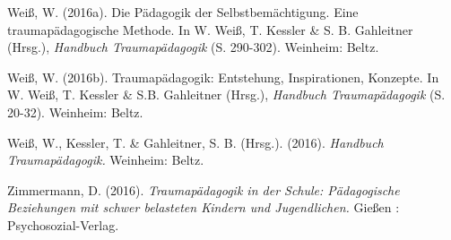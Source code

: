 \hang
Weiß, W. (2016a). Die Pädagogik der Selbstbemächtigung. Eine traumapädagogische Methode. In W. Weiß, T. Kessler \& S. B. Gahleitner (Hrsg.), \textit{Handbuch Traumapädagogik} (S. 290-302). Weinheim: Beltz.

\hang
Weiß, W. (2016b). Traumap{\"a}dagogik: Entstehung, Inspirationen, Konzepte. In W. Weiß, T. Kessler \& S.B. Gahleitner (Hrsg.), \textit{Handbuch Traumapädagogik} (S. 20-32). Weinheim: Beltz.

\hang
Weiß, W., Kessler, T. \& Gahleitner, S. B. (Hrsg.). (2016). \textit{Handbuch Traumapädagogik.} Weinheim: Beltz.

\hang
Zimmermann, D. (2016). \textit{Traumapädagogik in der Schule: Pädagogische Beziehungen mit schwer belasteten Kindern und Jugendlichen.} Gießen : Psychosozial-Verlag.
